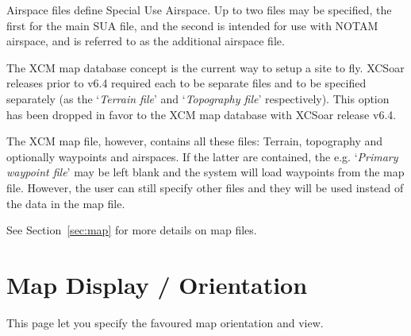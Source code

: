 Airspace files define Special Use Airspace.  Up to two files may be
specified, the first for the main SUA file, and the second is intended
for use with NOTAM airspace, and is referred to as the additional
airspace file.

The XCM map database concept is the current way to setup a site to fly.
XCSoar releases prior to v6.4 required each to be separate files and to be
specified separately (as the `{\it Terrain file}' and `{\it Topography file}' respectively). This 
option has been dropped in favor to the XCM map database with XCSoar release v6.4.  

The XCM map file, however, contains all these files: Terrain, topography
and optionally waypoints and airspaces.  If the latter are contained, the e.g. `{\it Primary waypoint file}' 
may be left blank and the system will load waypoints from the map file. 
However, the user can still specify other files and they will be used instead of 
the data in the map file.

See Section~\ref{sec:map} for more details on map files.


\section{Map Display / Orientation}\label{sec:map-projection}

This page let you specify the favoured map orientation and view.

